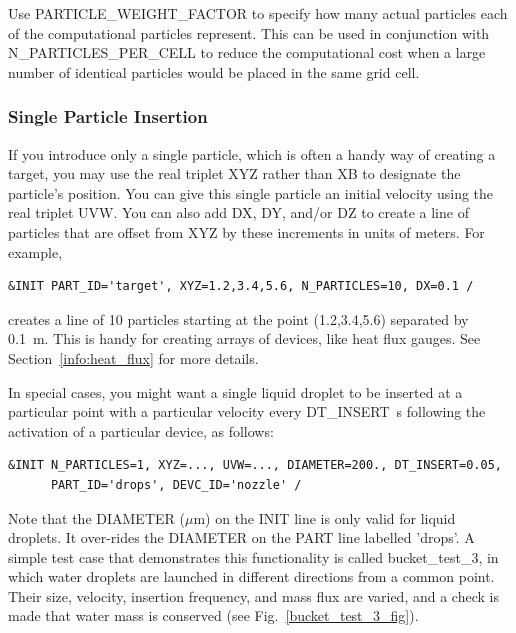 \documentclass[11pt]{book}
\begin{document}
Use {\ct PARTICLE\_WEIGHT\_FACTOR} to specify how many actual particles each of the computational particles represent. This can be used in conjunction with {\ct N\_PARTICLES\_PER\_CELL} to reduce the computational cost when a large number of identical particles would be placed in the same grid cell.


\subsubsection{Single Particle Insertion}

If you introduce only a single particle, which is often a handy way of creating a target, you may use the real triplet {\ct XYZ} rather than {\ct XB} to designate the particle's position.  You can give this single particle an initial velocity using the real triplet {\ct UVW}. You can also add {\ct DX}, {\ct DY}, and/or {\ct DZ} to create a line of particles that are offset from {\ct XYZ} by these increments in units of meters. For example,
\begin{lstlisting}
&INIT PART_ID='target', XYZ=1.2,3.4,5.6, N_PARTICLES=10, DX=0.1 /
\end{lstlisting}
creates a line of 10 particles starting at the point (1.2,3.4,5.6) separated by 0.1~m. This is handy for creating arrays of devices, like heat flux gauges. See Section~\ref{info:heat_flux} for more details.

In special cases, you might want a single liquid droplet to be inserted at a particular point with a particular velocity every {\ct DT\_INSERT}~s following the activation of a particular device, as follows:
\begin{lstlisting}
&INIT N_PARTICLES=1, XYZ=..., UVW=..., DIAMETER=200., DT_INSERT=0.05,
      PART_ID='drops', DEVC_ID='nozzle' /
\end{lstlisting}
Note that the {\ct DIAMETER} ($\mu$m) on the {\ct INIT} line is only valid for liquid droplets. It over-rides the {\ct DIAMETER} on the {\ct PART} line labelled {\ct 'drops'}. A simple test case that demonstrates this functionality is called {\ct bucket\_test\_3}, in which water droplets are launched in different directions from a common point. Their size, velocity, insertion frequency, and mass flux are varied, and a check is made that water mass is conserved (see Fig.~\ref{bucket_test_3_fig}).
\end{document}
